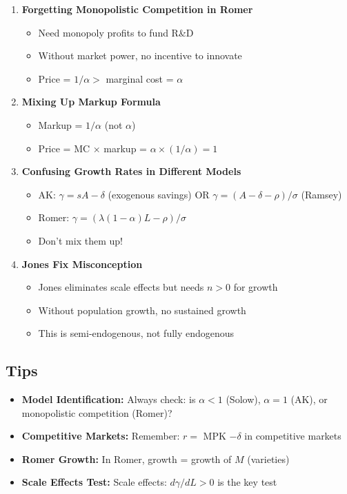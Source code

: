 \begin{enumerate}
    \item \textbf{Forgetting Monopolistic Competition in Romer}
    \begin{itemize}
        \item Need monopoly profits to fund R\&D
        \item Without market power, no incentive to innovate
        \item Price = $1/\alpha >$ marginal cost = $\alpha$
    \end{itemize}

    \item \textbf{Mixing Up Markup Formula}
    \begin{itemize}
        \item Markup = $1/\alpha$ (not $\alpha$)
        \item Price = MC × markup = $\alpha \times (1/\alpha) = 1$
    \end{itemize}

    \item \textbf{Confusing Growth Rates in Different Models}
    \begin{itemize}
        \item AK: $\gamma = sA - \delta$ (exogenous savings) OR $\gamma = (A-\delta-\rho)/\sigma$ (Ramsey)
        \item Romer: $\gamma = (\lambda(1-\alpha)L - \rho)/\sigma$
        \item Don't mix them up!
    \end{itemize}

    \item \textbf{Jones Fix Misconception}
    \begin{itemize}
        \item Jones eliminates scale effects but needs $n > 0$ for growth
        \item Without population growth, no sustained growth
        \item This is semi-endogenous, not fully endogenous
    \end{itemize}
\end{enumerate}

\subsection*{Tips}

\begin{itemize}
    \item \textbf{Model Identification:} Always check: is $\alpha < 1$ (Solow), $\alpha = 1$ (AK), or monopolistic competition (Romer)?
    \item \textbf{Competitive Markets:} Remember: $r =$ MPK $-\delta$ in competitive markets
    \item \textbf{Romer Growth:} In Romer, growth = growth of $M$ (varieties)
    \item \textbf{Scale Effects Test:} Scale effects: $d\gamma/dL > 0$ is the key test
\end{itemize}
